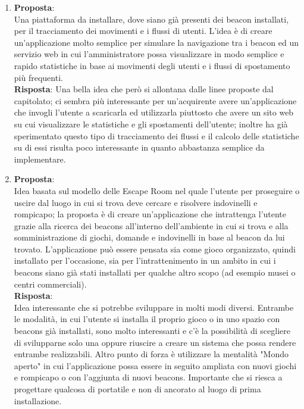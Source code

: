 \documentclass[a4paper,titlepage]{article}
\begin{document}
\begin{enumerate}
  \item \textbf{Proposta}: \\
  Una piattaforma da installare, dove siano già presenti dei beacon installati, per il tracciamento dei movimenti e i flussi di utenti. L'idea è di creare un'applicazione molto semplice per simulare la navigazione tra i beacon ed un servizio web in cui l'amministratore possa visualizzare in modo semplice e rapido statistiche in base ai movimenti degli utenti e i flussi di spostamento più frequenti. \\
  \textbf{Risposta}:
  Una bella idea che però si allontana dalle linee proposte dal capitolato; ci sembra più interessante per un'acquirente avere un'applicazione che invogli l'utente a scaricarla ed utilizzarla piuttosto che  avere un sito web su cui visualizzare le statistiche e gli spostamenti dell'utente; inoltre \PROPONENTE{} ha già sperimentato questo tipo di tracciamento dei flussi e il calcolo delle statistiche su di essi risulta poco interessante in quanto abbastanza semplice da implementare.
  \item \textbf{Proposta}: \\
  Idea basata sul modello delle Escape Room nel quale l'utente per proseguire o uscire dal luogo in cui si trova deve cercare e risolvere indovinelli e rompicapo; la proposta è di creare un'applicazione che intrattenga l'utente grazie alla ricerca dei beacons all'interno dell'ambiente in cui si trova e alla somministrazione di giochi, domande e indovinelli in base al beacon da lui trovato. L'applicazione può essere pensata sia come gioco organizzato, quindi installato per l'occasione, sia per l'intrattenimento in un ambito in cui i beacons siano già stati installati per qualche altro scopo (ad esempio musei o centri commerciali).\\
  \textbf{Risposta}: \\
  Idea interessante che si potrebbe sviluppare in molti modi diversi. Entrambe le modalità, in cui l'utente si installa il proprio gioco o in uno spazio con beacons già installati, sono molto interessanti e c'è la possibilità di scegliere di svilupparne solo una oppure riuscire a creare un sistema che possa rendere entrambe realizzabili. Altro punto di forza è utilizzare la mentalità "Mondo aperto" in cui l'applicazione possa essere in seguito ampliata con nuovi giochi e rompicapo o con l'aggiunta di nuovi beacons. Importante che si riesca a progettare qualcosa di portatile e non di ancorato al luogo di prima installazione.

\end{enumerate}
\end{document}
